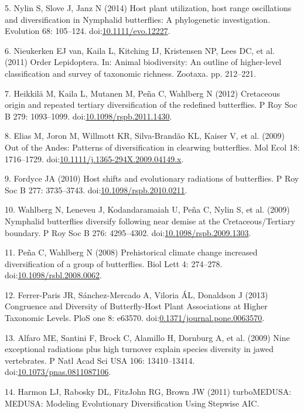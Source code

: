 \documentclass[10pt]{article}
\begin{document}
5. Nylin S, Slove J, Janz N (2014) Host plant utilization, host range
oscillations and diversification in Nymphalid butterflies: A
phylogenetic investigation. Evolution 68: 105--124.
doi:\href{http://dx.doi.org/10.1111/evo.12227}{10.1111/evo.12227}.

6. Nieukerken EJ van, Kaila L, Kitching IJ, Kristensen NP, Lees DC, et
al. (2011) Order Lepidoptera. In: Animal biodiversity: An outline of
higher-level classification and survey of taxonomic richness. Zootaxa.
pp. 212--221.

7. Heikkilä M, Kaila L, Mutanen M, Peña C, Wahlberg N (2012) Cretaceous
origin and repeated tertiary diversification of the redefined
butterflies. P Roy Soc B 279: 1093--1099.
doi:\href{http://dx.doi.org/10.1098/rspb.2011.1430}{10.1098/rspb.2011.1430}.

8. Elias M, Joron M, Willmott KR, Silva-Brandão KL, Kaiser V, et al.
(2009) Out of the Andes: Patterns of diversification in clearwing
butterflies. Mol Ecol 18: 1716--1729.
doi:\href{http://dx.doi.org/10.1111/j.1365-294X.2009.04149.x}{10.1111/j.1365-294X.2009.04149.x}.

9. Fordyce JA (2010) Host shifts and evolutionary radiations of
butterflies. P Roy Soc B 277: 3735--3743.
doi:\href{http://dx.doi.org/10.1098/rspb.2010.0211}{10.1098/rspb.2010.0211}.

10. Wahlberg N, Leneveu J, Kodandaramaiah U, Peña C, Nylin S, et al.
(2009) Nymphalid butterflies diversify following near demise at the
Cretaceous/Tertiary boundary. P Roy Soc B 276: 4295--4302.
doi:\href{http://dx.doi.org/10.1098/rspb.2009.1303}{10.1098/rspb.2009.1303}.

11. Peña C, Wahlberg N (2008) Prehistorical climate change increased
diversification of a group of butterflies. Biol Lett 4: 274--278.
doi:\href{http://dx.doi.org/10.1098/rsbl.2008.0062}{10.1098/rsbl.2008.0062}.

12. Ferrer-Paris JR, S{á}nchez-Mercado A, Viloria ÁL, Donaldson J (2013)
Congruence and Diversity of Butterfly-Host Plant Associations at Higher
Taxonomic Levels. PloS one 8: e63570.
doi:\href{http://dx.doi.org/0.1371/journal.pone.0063570}{0.1371/journal.pone.0063570}.

13. Alfaro ME, Santini F, Brock C, Alamillo H, Dornburg A, et al. (2009)
Nine exceptional radiations plus high turnover explain species diversity
in jawed vertebrates. P Natl Acad Sci USA 106: 13410--13414.
doi:\href{http://dx.doi.org/10.1073/pnas.0811087106}{10.1073/pnas.0811087106}.

14. Harmon LJ, Rabosky DL, {FitzJohn} RG, Brown JW (2011) turboMEDUSA:
MEDUSA: Modeling Evolutionary Diversification Using Stepwise AIC.
\end{document}
